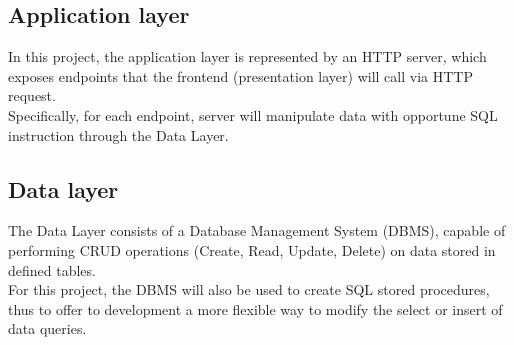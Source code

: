 \documentclass[conference]{IEEEtran}
\begin{document}
\subsection{Application layer}

In this project, the application layer is represented by an HTTP server, which exposes endpoints that the frontend (presentation layer) will call via HTTP request.
\\
Specifically, for each endpoint, server will manipulate data with opportune SQL instruction through the Data Layer.

\subsection{Data layer}

The Data Layer consists of a Database Management System (DBMS), capable of performing CRUD operations (Create, Read, Update, Delete) on data stored in defined tables.
\\
For this project, the DBMS will also be used to create SQL stored procedures, thus to offer to development a more flexible way to modify the select or insert of data queries.
\end{document}

